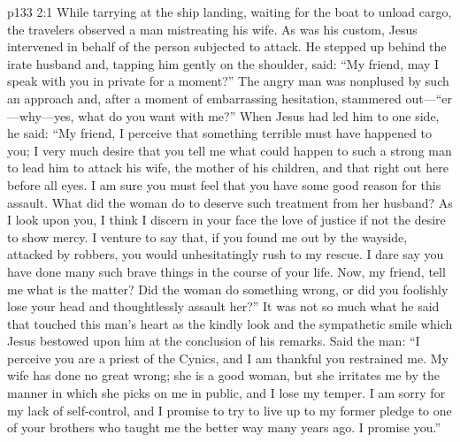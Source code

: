 \vs p133 2:1 While tarrying at the ship landing, waiting for the boat to unload cargo, the travelers observed a man mistreating his wife. As was his custom, Jesus intervened in behalf of the person subjected to attack. He stepped up behind the irate husband and, tapping him gently on the shoulder, said: \textcolor{ubdarkred}{“My friend, may I speak with you in private for a moment?”} The angry man was nonplused by such an approach and, after a moment of embarrassing hesitation, stammered out---“er---why---yes, what do you want with me?” When Jesus had led him to one side, he said: \textcolor{ubdarkred}{“My friend, I perceive that something terrible must have happened to you; I very much desire that you tell me what could happen to such a strong man to lead him to attack his wife, the mother of his children, and that right out here before all eyes. I am sure you must feel that you have some good reason for this assault. What did the woman do to deserve such treatment from her husband? As I look upon you, I think I discern in your face the love of justice if not the desire to show mercy. I venture to say that, if you found me out by the wayside, attacked by robbers, you would unhesitatingly rush to my rescue. I dare say you have done many such brave things in the course of your life. Now, my friend, tell me what is the matter? Did the woman do something wrong, or did you foolishly lose your head and thoughtlessly assault her?”} It was not so much what he said that touched this man’s heart as the kindly look and the sympathetic smile which Jesus bestowed upon him at the conclusion of his remarks. Said the man: “I perceive you are a priest of the Cynics, and I am thankful you restrained me. My wife has done no great wrong; she is a good woman, but she irritates me by the manner in which she picks on me in public, and I lose my temper. I am sorry for my lack of self\hyp{}control, and I promise to try to live up to my former pledge to one of your brothers who taught me the better way many years ago. I promise you.”
